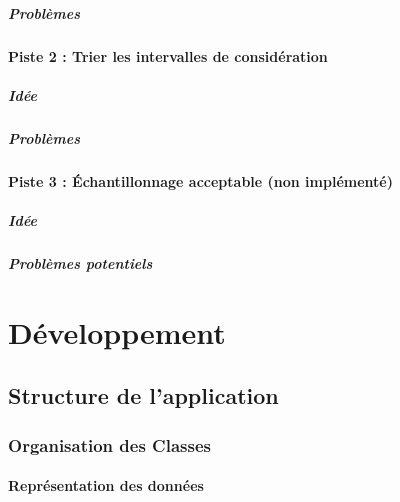 \documentclass[a4paper,10pt]{report}
\begin{document}
\subsubsection{Problèmes}


\subsection{Piste 2 : Trier les intervalles de considération}
\subsubsection{Idée}

\subsubsection{Problèmes}

\subsection{Piste 3 : Échantillonnage acceptable (non implémenté)}
\subsubsection{Idée}

\subsubsection{Problèmes potentiels}


\part{Développement}
\chapter{Structure de l'application}
\section{Organisation des Classes}
\subsection{Représentation des données}
\end{document}
